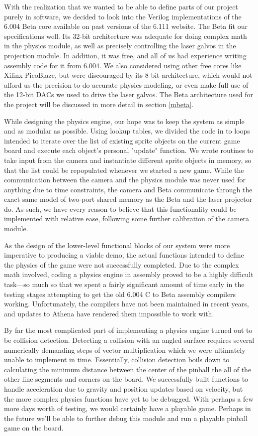 \documentclass{article}
\begin{document}
With the realization that we wanted to be able to define parts of our project purely in software, we decided to look into the Verilog implementations of the 6.004 Beta core available on past versions of the 6.111 website. The Beta fit our specifications well. Its 32-bit architecture was adequate for doing complex math in the physics module, as well as precisely controlling the laser galvos in the projection module. In addition, it was free, and all of us had experience writing assembly code for it from 6.004. We also considered using other free cores like Xilinx PicoBlaze, but were discouraged by its 8-bit architecture, which would not afford us the precision to do accurate physics modeling, or even make full use of the 12-bit DACs we used to drive the laser galvos. The Beta architecture used for the project will be discussed in more detail in section \ref{mbeta}.

While designing the physics engine, our hope was to keep the system as simple and as modular as possible. Using lookup tables, we divided the code in to loops intended to iterate over the list of existing sprite objects on the current game board and execute each object's personal "update" function. We wrote routines to take input from the camera and instantiate different sprite objects in memory, so that the list could be repopulated whenever we started a new game. While the communication between the camera and the physics module was never used for anything due to time constraints, the camera and Beta communicate through the exact same model of two-port shared memory as the Beta and the laser projector do. As such, we have every reason to believe that this functionality could be implemented with relative ease, following some further calibration of the camera module.

As the design of the lower-level functional blocks of our system were more imperative to producing a viable demo, the actual functions intended to define the physics of the game were not successfully completed. Due to the complex math involved, coding a physics engine in assembly proved to be a highly difficult task---so much so that we spent a fairly significant amount of time early in the testing stages attempting to get the old 6.004 C to Beta assembly compilers working. Unfortunately, the compilers have not been maintained in recent years, and updates to Athena have rendered them impossible to work with.

By far the most complicated part of implementing a physics engine turned out to be collision detection. Detecting a collision with an angled surface requires several numerically demanding steps of vector multiplication which we were ultimately unable to implement in time. Essentially, collision detection boils down to calculating the minimum distance between the center of the pinball the all of the other line segments and corners on the board. We successfully built functions to handle acceleration due to gravity and position updates based on velocity, but the more complex physics functions have yet to be debugged. With perhaps a few more days worth of testing, we would certainly have a playable game. Perhaps in the future we'll be able to further debug this module and run a playable pinball game on the board.
\end{document}
